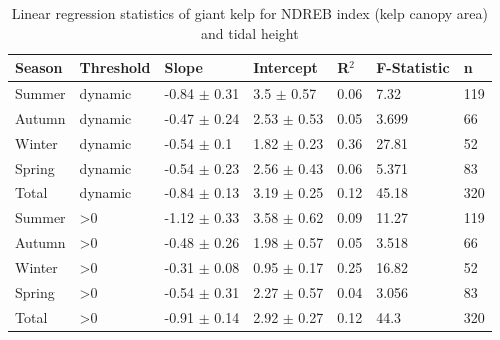 \documentclass[a4paper,fleqn]{cas-sc}
\begin{document}
\begin{table}[width=.9\linewidth,cols=6,pos=!htbp]
\caption{Linear regression statistics of giant kelp for NDREB index (kelp canopy area) and tidal height}
\small
\begin{tabular*}{\tblwidth}{@{} LLLLLLL@{} }
\toprule
Season & Threshold & Slope & Intercept & R$^{2}$ & F-Statistic & n\\
\midrule
Summer  & dynamic & -0.84 $\pm$ 0.31 & 3.5 $\pm$ 0.57 & 0.06 & 7.32 & 119 \\
Autumn  & dynamic & -0.47 $\pm$ 0.24 & 2.53 $\pm$ 0.53 & 0.05 & 3.699 & 66 \\
Winter  & dynamic & -0.54 $\pm$ 0.1 & 1.82 $\pm$ 0.23 & 0.36 & 27.81 & 52 \\
Spring  & dynamic & -0.54 $\pm$ 0.23 & 2.56 $\pm$ 0.43 & 0.06 & 5.371 & 83 \\
Total  & dynamic & -0.84 $\pm$ 0.13 & 3.19 $\pm$ 0.25 & 0.12 & 45.18 & 320 \\
Summer  & >0 & -1.12 $\pm$ 0.33 & 3.58 $\pm$ 0.62 & 0.09 & 11.27 & 119 \\
Autumn  & >0 & -0.48 $\pm$ 0.26 & 1.98 $\pm$ 0.57 & 0.05 & 3.518 & 66 \\
Winter  & >0 & -0.31 $\pm$ 0.08 & 0.95 $\pm$ 0.17 & 0.25 & 16.82 & 52 \\
Spring  & >0 & -0.54 $\pm$ 0.31 & 2.27 $\pm$ 0.57 & 0.04 & 3.056 & 83 \\
Total  & >0 & -0.91 $\pm$ 0.14 & 2.92 $\pm$ 0.27 & 0.12 & 44.3 & 320 \\
\bottomrule
\end{tabular*}
\label{tab:14}
\end{table}
\end{document}
